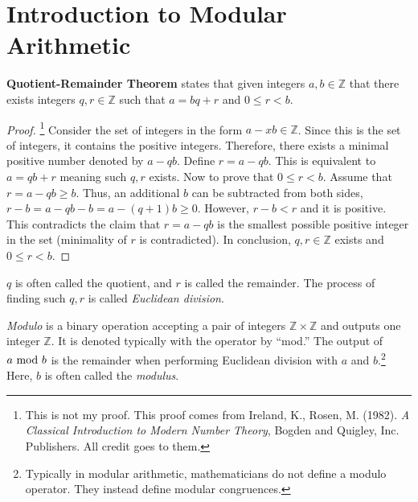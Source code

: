 
\section{Introduction to Modular Arithmetic}

\begin{theorem}
    \textbf{Quotient-Remainder Theorem} states that given integers \(a,b\in\mathbb{Z}\) that there exists integers \(q,r\in\mathbb{Z}\) 
    such that \(a=bq+r\) and \(0\le r<b\). 
\end{theorem}
\begin{proof}
    \footnote{This is not my proof. This proof comes from Ireland, K., Rosen, M. (1982). \emph{A Classical Introduction to Modern Number Theory}, Bogden and Quigley, Inc. 
    Publishers. All credit goes to them.} Consider the set of integers in the form \(a-xb\in\mathbb{Z}\). Since this is the set of integers, it contains the positive integers.
    Therefore, there exists a minimal positive number denoted by \(a-qb\). Define \(r=a-qb\). This is equivalent to \(a=qb+r\) meaning such \(q,r\) exists. Now to prove that
    \(0\le r<b\). Assume that \(r=a-qb\ge b\). Thus, an additional \(b\) can be subtracted from both sides, \(r-b=a-qb-b=a-(q+1)b\ge0\). However, \(r-b<r\) and it is positive.
    This contradicts the claim that \(r=a-qb\) is the smallest possible positive integer in the set (minimality of \(r\) is contradicted). In conclusion, \(q,r\in\mathbb{Z}\)
    exists and \(0\le r<b\).
\end{proof}

\(q\) is often called the quotient, and \(r\) is called the remainder. The process of finding such \(q,r\) is called \emph{Euclidean division}.
\bigskip
\begin{definition}
    \emph{Modulo} is a binary operation accepting a pair of integers \(\mathbb{Z}\times\mathbb{Z}\) and outputs one integer \(\mathbb{Z}\). It is denoted typically with the
    operator by ``mod.'' The output of \(a\text{ mod } b\) is the remainder when performing Euclidean division with \(a\) and \(b\).\footnote{Typically in modular arithmetic, mathematicians
    do not define a modulo operator. They instead define modular congruences.} Here, \(b\) is often called the \emph{modulus}.
\end{definition}


